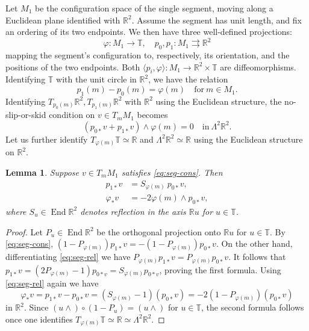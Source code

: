 \documentclass{article}
\def\RR{\mathbb{R}}
\def\TT{\mathbb{T}}
\DeclareMathOperator{\End}{\mathrm{End}}
\newtheorem{lem}{Lemma}
\theoremstyle{definition}
\begin{document}
Let $M_1$ be the configuration space of the single segment, moving along
a Euclidean plane identified with $\RR^2$.
Assume the segment has unit length, and fix an ordering of its two endpoints.
We then have three well-defined projections:
$$
 \varphi : M_1 \to \TT,\quad p_0, p_1 : M_1 \rightrightarrows \RR^2
$$
mapping the segment's configuration to, respectively,
its orientation, and the positions of the two endpoints.
Both $\langle p_i,\varphi\rangle : M_1 \to \RR^2\times\TT$
are diffeomorphisms.
Identifying $\TT$ with the unit circle in $\RR^2$, we have the relation
\begin{equation}\label{eq:seg-rel} p_1(m) - p_0(m) = \varphi(m)\quad\textrm{for}\ m \in M_1.\end{equation}
Identifying $T_{p_0(m)}\RR^2, T_{p_1(m)}\RR^2$ with $\RR^2$
using the Euclidean structure,
the no-slip-or-skid condition
on $v \in T_m M_1$ becomes 
\begin{equation}
        \label{eq:seg-cons}
        (p_{0*}v + p_{1*}v) \wedge \varphi(m) = 0\quad \textrm{in}\ \Lambda^2\RR^2.
\end{equation}
Let us further identify $T_{\varphi(m)}\TT \simeq \RR$  and $\Lambda^2\RR^2 \simeq \RR$
using the Euclidean structure on $\RR^2$.
\begin{lem}\label{lem:seg-trans}
        Suppose $v \in T_m M_1$ satisfies \eqref{eq:seg-cons}. Then
        \begin{align}
                p_{1*}v & = S_{\varphi(m)}\  p_{0*}v,\\
                \varphi_*v&= -2\varphi(m)\wedge p_{0*}v,
        \end{align}
        where $S_u \in \End\RR^2$ denotes reflection in the axis $\RR u$ for $u \in \TT$.
\end{lem}
\begin{proof}
        Let $P_u \in \End\RR^2$ be the orthogonal projection onto $\RR u$ for $u \in \TT$.
        By \eqref{eq:seg-cons}, $(1-P_{\varphi(m)}) p_{1*}v = - (1-P_{\varphi(m)}) p_{0*}v$. On the other hand,
        differentiating \eqref{eq:seg-rel} we have $P_{\varphi(m)} p_{1*}v=P_{\varphi(m)} p_{0*}v$. It follows that
        $p_{1*}v = (2P_{\varphi(m)}-1)p_{0*v} = S_{\varphi(m)}p_{0*v}$, proving the first formula.
        Using \eqref{eq:seg-rel} again 
        we have $$\varphi_* v = p_{1*}v-p_{0*}v = (S_{\varphi(m)}-1) (p_{0*}v) = -2(1-P_{\varphi(m)}) (p_{0*}v)$$
        in $\RR^2$.
        Since $(u\wedge) \circ (1-P_u) = (u\wedge)$ for $u \in \TT$, the second formula follows
        once one identifies $T_{\varphi(m)}\TT\simeq\RR\simeq\Lambda^2\RR^2$.
\end{proof}
\end{document}
